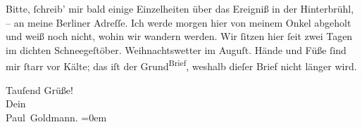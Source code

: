 \pstart
           Bitte, ſchreib’ mir bald {\pb}einige Einzelheiten über
               das Ereigniß in der Hinterbrühl, – an meine Berliner Adreſſe. Ich werde morgen{ }hier von meinem Onkel abgeholt und weiß noch
               nicht, wohin wir wandern werden. Wir ſitzen hier ſeit zwei Tagen im dichten Schneegeſtöber.
               Weihnachtswetter im Auguſt. Hände und Füße ſind mir ſtarr vor Kälte; das iſt der \introOben{}Grund\introOben{}{ }\substVorne{}\textsuperscript{Brief}\substDazwischen{}\substHinten{}, weshalb  dieſer Brief nicht länger
               wird.\pend
           
\pstart
           {\pb}Tauſend Grüße! {\\[\baselineskip]}Dein {\\[\baselineskip]}\spacefill\mbox{Paul Goldmann.}\pend
           \leftskip=0em{}\endnumbering{}  
      